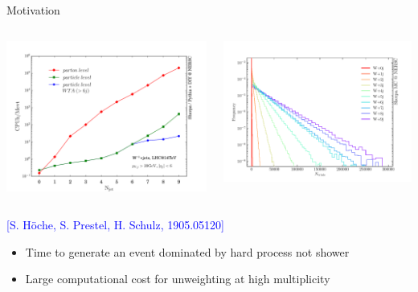\documentclass{beamer}
\newcommand\reference[1]{%
{\tiny \textcolor{blue}{[#1]}}
}
\begin{document}
\begin{frame}{Motivation}
\begin{columns}
\begin{column}{0.5\textwidth}
\includegraphics[width=1.1\textwidth]{figs/timing.pdf}
\end{column}
\begin{column}{0.5\textwidth}
\includegraphics[width=1.1\textwidth]{figs/trials.pdf}
\end{column}
\end{columns}
\begin{center}
\reference{S. H\"oche, S. Prestel, H. Schulz, 1905.05120}
\end{center}

\begin{itemize}
    \item Time to generate an event dominated by hard process not shower
    \item Large computational cost for unweighting at high multiplicity
\end{itemize}
    
\end{frame}
\end{document}
